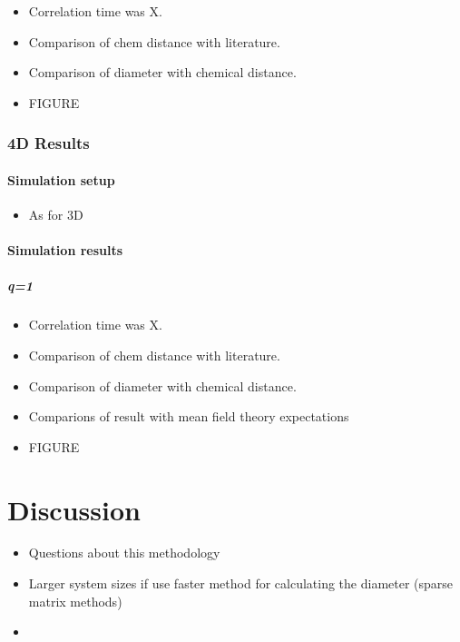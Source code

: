 \documentclass{article}
\begin{document}
\begin{itemize}
\item Correlation time was X.
\item Comparison of chem distance with literature.
\item Comparison of diameter with chemical distance.
\item FIGURE
\end{itemize}
\subsubsection{4D Results}
\label{sec-2.3.3}
\paragraph{Simulation setup}
\label{sec-2.3.3.1}

\begin{itemize}
\item As for 3D
\end{itemize}
\paragraph{Simulation results}
\label{sec-2.3.3.2}
\subparagraph{q=1}
\label{sec-2.3.3.2.1}

\begin{itemize}
\item Correlation time was X.
\item Comparison of chem distance with literature.
\item Comparison of diameter with chemical distance.
\item Comparions of result with mean field theory expectations
\item FIGURE
\end{itemize}
\section{Discussion}
\label{sec-3}

\begin{itemize}
\item Questions about this methodology
\item Larger system sizes if use faster method for calculating the
  diameter (sparse matrix methods)
\item 
\end{itemize}
\end{document}
